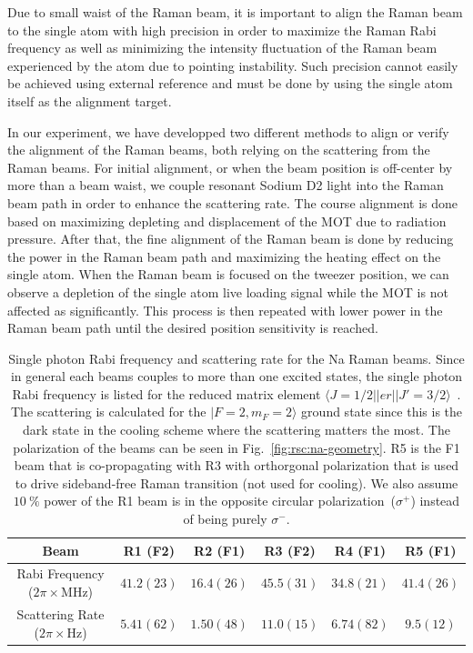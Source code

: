 Due to small waist of the Raman beam, it is important to align the Raman beam to
the single atom with high precision in order to maximize the Raman Rabi frequency
as well as minimizing the intensity fluctuation of the Raman beam experienced by the atom
due to pointing instability.
Such precision cannot easily be achieved using external reference and
must be done by using the single atom itself as the alignment target.

In our experiment, we have developped two different methods to align or verify the alignment
of the Raman beams, both relying on the scattering from the Raman beams.
For initial alignment, or when the beam position is off-center
by more than a beam waist, we couple resonant Sodium D2 light into the Raman beam path
in order to enhance the scattering rate. The course alignment is done based on
maximizing depleting and displacement of the MOT due to radiation pressure.
After that, the fine alignment of the Raman beam is done by reducing the power in the Raman
beam path and maximizing the heating effect on the single atom.
When the Raman beam is focused on the tweezer position,
we can observe a depletion of the single atom live loading signal
while the MOT is not affected as significantly.
This process is then repeated with lower power in the Raman beam path until the desired
position sensitivity is reached.

\begin{table}
  \centering
  \caption[Na Raman beams parameters.]{
    Single photon Rabi frequency and scattering rate for the Na Raman beams.
    Since in general each beams couples to more than one excited states,
    the single photon Rabi frequency is listed for the reduced matrix element
    $\langle J=1/2||er||J'=3/2\rangle$~\cite{steck_sodium_2019}.
    The scattering is calculated for the $|F=2,m_F=2\rangle$ ground state
    since this is the dark state in the cooling scheme where the scattering matters the most.
    The polarization of the beams can be seen in Fig.~\ref{fig:rsc:na-geometry}.
    R5 is the F1 beam that is co-propagating with R3 with orthorgonal polarization
    that is used to drive sideband-free Raman transition (not used for cooling).
    We also assume $10~\mathrm{\%}$ power of the R1 beam is
    in the opposite circular polarization~($\sigma^+$) instead of being purely $\sigma^-$.
    \label{table:rsc:alignment:raman-parameter}}
  \begin{tabular}{|c|c|c|c|c|c|}
    \hline
    Beam&R1 (F2)&R2 (F1)&R3 (F2)&R4 (F1)&R5 (F1)\\\hline
    \makecell{Rabi Frequency\\($2\pi\times\mathrm{MHz}$)}&$41.2(23)$&$16.4(26)$&$45.5(31)$&$34.8(21)$&$41.4(26)$\\\hline
    \makecell{Scattering Rate\\($2\pi\times\mathrm{Hz}$)}&$5.41(62)$&$1.50(48)$&$11.0(15)$&$6.74(82)$&$9.5(12)$\\\hline
  \end{tabular}
\end{table}

